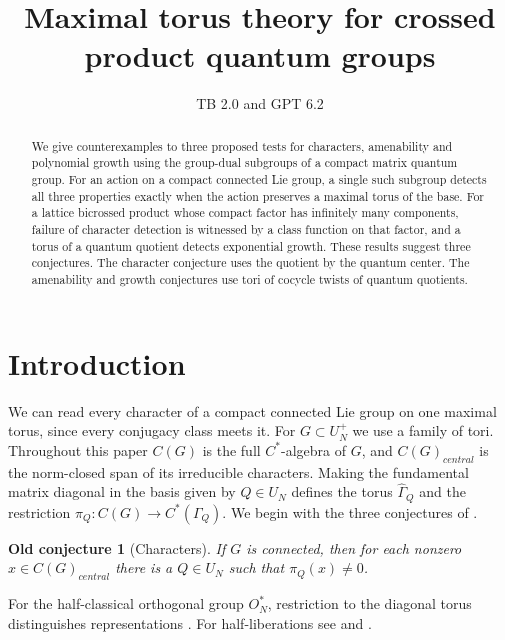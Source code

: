 \documentclass[11pt,a4paper]{article}
\title{Maximal torus theory for crossed product quantum groups}
\author{TB 2.0 and GPT 6.2}
\date{}
\newtheorem{oldconj}{Old conjecture}
\theoremstyle{remark}
\begin{document}
\maketitle

\begin{abstract}
We give counterexamples to three proposed tests for characters,
amenability and polynomial growth using the group-dual subgroups of a
compact matrix quantum group. For an action on a compact connected Lie
group, a single such subgroup detects all three properties exactly when
the action preserves a maximal torus of the base. For a lattice
bicrossed product whose compact factor has infinitely many components,
failure of character detection is witnessed by a class function on that
factor, and a torus of a quantum quotient detects exponential growth.
These results suggest three conjectures. The character conjecture uses
the quotient by the quantum center. The amenability and growth
conjectures use tori of cocycle twists of quantum quotients.
\end{abstract}

\begingroup
\color{magenta}\hypersetup{linkcolor=magenta}
\setlength{\parskip}{0pt}
\makeatletter
\patchcmd{\l@section}{\addvspace{1.0em \@plus\p@}}{\addvspace{0pt}}{}{}
\makeatother
\tableofcontents
\endgroup

\section*{Introduction}
We can read every character of a compact connected Lie group on one
maximal torus, since every conjugacy class meets it. For $G\subset U_N^+$
we use a family of tori. Throughout this paper $C(G)$ is the full
$C^*$-algebra of $G$, and $C(G)_{central}$ is the norm-closed span of
its irreducible characters. Making the fundamental matrix diagonal in
the basis given by $Q\in U_N$ defines the torus $\widehat{\Gamma}_Q$
and the restriction $\pi_Q:C(G)\to C^*(\Gamma_Q)$. We begin with
the three conjectures of \cite{bp}.

\begin{oldconj}[Characters]\label{oldchar}
If $G$ is connected, then for each nonzero $x\in C(G)_{central}$ there is a
$Q\in U_N$ such that $\pi_Q(x)\ne0$.
\end{oldconj}

For the half-classical orthogonal group $O_N^*$, restriction to the
diagonal torus distinguishes representations \cite[Theorem~6.2]{halforth}.
For half-liberations see \cite[Theorem~5.5]{bp}
and \cite[Chapter~14]{qg}.
\end{document}
